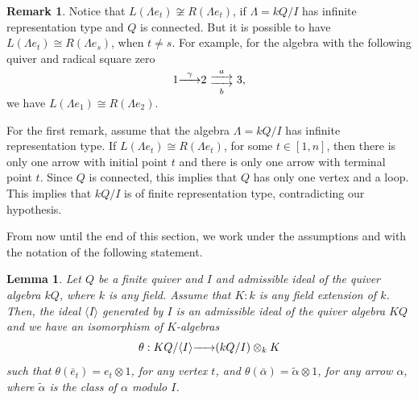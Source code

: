 \documentclass{article}
\newtheorem{lemma}[theorem]{Lemma}
\theoremstyle{definition}
\newtheorem{remark}[theorem]{Remark}
\newcommand{\rightmap}[1]{\smash{\mathop{\hbox to 
20pt{\rightarrowfill}}\limits^{#1}}}
\newcommand{\dobleflechava}[2]{\ \smash{\mathop{
   \raise 3pt 
   \hbox to 20pt{\rightarrowfill}\hskip-20pt         \lower 3pt
   \hbox to 20pt{\rightarrowfill}}\limits^{#1}_{#2}}\ }
\begin{document}
\begin{remark}\label{R: puedo tener R(Lambda et) cong L(Lambda es)} Notice that $L(\Lambda e_t)\not\cong R(\Lambda e_t)$,   if $\Lambda=kQ/I$ has infinite representation type and $Q$ is connected. 
 But it is possible to have $L(\Lambda e_t)\cong R(\Lambda e_s)$, when $t\not=s$. For example, for the algebra with the following quiver and radical square zero
$$1\rightmap{ \ \gamma \ }2\dobleflechava{a}{b}3,$$
we have  $L(\Lambda e_1)\cong R(\Lambda e_2)$. 

For the first remark, assume that the algebra $\Lambda=kQ/I$  has  infinite representation type.   If $L(\Lambda e_t)\cong R(\Lambda e_t)$, for some $t\in [1,n]$, then there is only one arrow with initial point $t$ and there is only one arrow with terminal point $t$. Since $Q$ is connected, this implies that $Q$ has only one vertex and a loop. This implies that $kQ/I$ is of finite representation type, contradicting our hypothesis. 
\end{remark}

From now until the end of this section, we work under the assumptions and with the notation of the following statement.    

\begin{lemma}\label{L: extensiones y algebras de carcaj}\label{R: realizacion de hat(Lambda) y }
Let $Q$ be a finite quiver and $I$ and admissible ideal of the quiver algebra $kQ$, where $k$ is any field. Assume that $K:k$ is any field extension of $k$. Then, the ideal 
$\langle I\rangle$ generated by $I$ is an admissible ideal of the quiver algebra $KQ$ and we have an isomorphism of $K$-algebras 
$$\theta: KQ/\langle I\rangle\rightmap{}(kQ/I)\otimes_kK$$
such that $\theta(\bar{e}_t)=e_t\otimes 1$, for any vertex $t$, and $\theta(\bar{\alpha})=\tilde{\alpha}\otimes 1$, for any arrow $\alpha$, where $\tilde{\alpha}$ is the class of $\alpha$ modulo $I$.   
\end{lemma}
\end{document}
